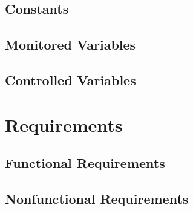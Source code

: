 \documentclass[12pt]{article}
\begin{document}
\subsection{Constants}
\subsection{Monitored Variables}
\subsection{Controlled Variables}

\section{Requirements}
\subsection{Functional Requirements}
\subsection{Nonfunctional Requirements}

\setcounter{vnvSectionNfr}{1}

\setcounter{nfrNum}{1}
\end{document}
